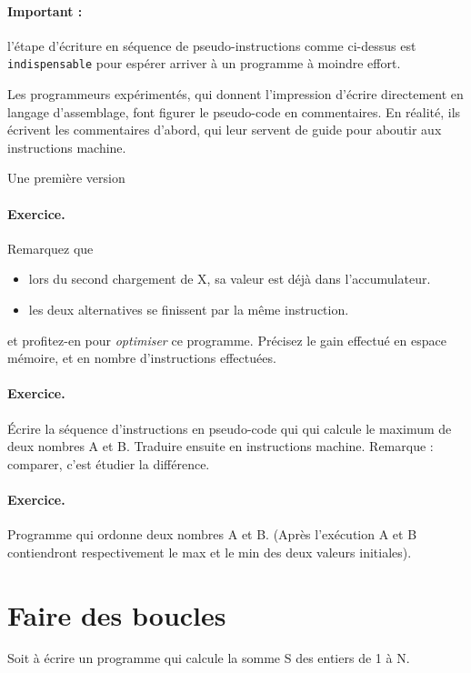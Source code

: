 \documentclass[10pt]{article}
\begin{document}
\paragraph{Important :} l'étape d'écriture en séquence 
de pseudo-instructions comme ci-dessus est \texttt{indispensable}
pour espérer arriver à un programme à moindre effort.

Les programmeurs expérimentés, qui donnent l'impression d'écrire
directement en langage d'assemblage, font figurer le pseudo-code en
commentaires. En réalité, ils écrivent les commentaires d'abord, qui
leur servent de guide pour aboutir aux instructions machine.

Une première version



\paragraph{Exercice.} Remarquez que
\begin{itemize}
\item lors du  second chargement de X, sa valeur est
déjà dans l'accumulateur.
\item les deux alternatives se finissent par la même
instruction.
\end{itemize}
et profitez-en pour \emph{optimiser} ce programme. Précisez
le gain effectué en espace mémoire, et en nombre d'instructions
effectuées.

\paragraph{Exercice.} Écrire la séquence d'instructions en pseudo-code qui
qui calcule le maximum de deux
nombres A et B. Traduire ensuite en instructions machine.
Remarque : comparer, c'est étudier la différence.


\paragraph{Exercice.} Programme qui ordonne deux nombres A et B.
(Après l'exécution A et B contiendront respectivement le max et le min des
deux valeurs initiales). 

\section{Faire des boucles}
Soit à écrire un programme qui calcule la somme S des entiers de 1 à N.
\end{document}
